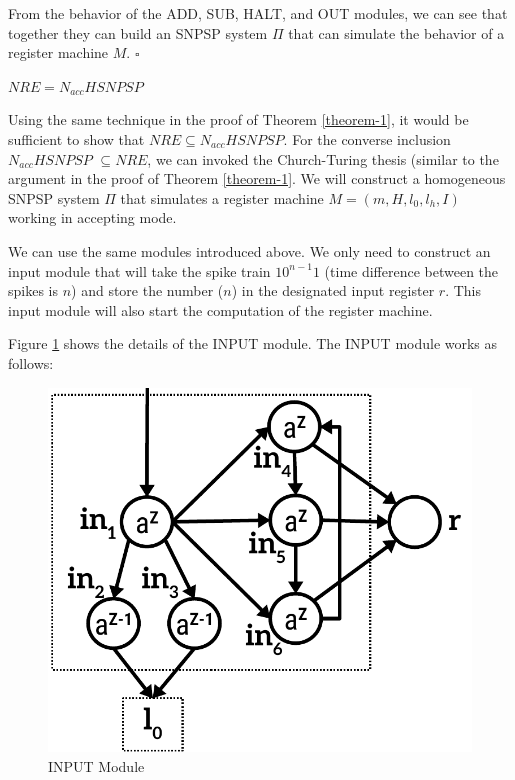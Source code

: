 \documentclass[smallextended]{svjour3}
\begin{document}

From the behavior of the ADD, SUB, HALT, and OUT modules, we can see that together they can build an SNPSP system $\Pi$ that can simulate the
behavior of a register machine $M.$ $\square$ 


\begin{theorem} \label{theorem-2}
$NRE = N_{acc}HSNPSP$ 
\end{theorem}
  
\proof Using the same technique in the proof of Theorem \ref{theorem-1}, it would be sufficient to show that $NRE \subseteq N_{acc}HSNPSP$. For the
converse inclusion $N_{acc}HSNPSP$ $\subseteq NRE$, we can invoked the Church-Turing thesis (similar to the argument in the proof of Theorem 
\ref{theorem-1}. We will construct a homogeneous SNPSP system $\Pi$ that simulates a register machine $M=(m, H, l_0, l_h, I)$ working in accepting mode.

We can use the same modules introduced above. We only need to construct an input module that will take the spike train
$10^{n-1}1$ (time difference between the spikes is $n$) and store the number ($n$) in the designated input register $r$. This input module will
also start the computation of the register machine.

Figure \ref{fig-input} shows the details of the INPUT module. The INPUT module works as follows:

\begin{figure}
\begin{center}
\includegraphics[scale=0.50]{Fig4.pdf}
\caption{INPUT Module}
\label{fig-input}
\end{center}
\end{figure}   
\end{document}

